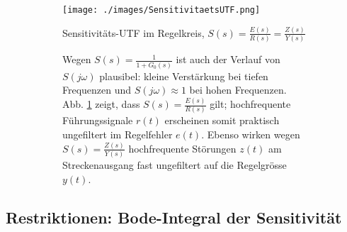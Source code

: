 \begin{figure}[h!]
	\begin{center}
	\begin{subfigure}[b]{9cm}
	\flushleft
			\texttt{[image: ./images/SensitivitaetsUTF.png]}
\caption{Sensitivitäts-UTF im Regelkreis, $S(s) = \frac{E(s)}{R(s)}=\frac{Z(s)}{Y(s)}$}
			\label{SensitivitaetRegelkreis}
	\end{subfigure}\qquad
	\begin{subfigure}[b]{8cm}
Wegen $S(s) = \frac{1}{1+G_0(s)}$ ist auch der Verlauf von $S(j\omega)$ plausibel: kleine Verstärkung
bei tiefen Frequenzen und $S(j\omega) \approx 1$ bei hohen Frequenzen. Abb. \ref{SensitivitaetRegelkreis} zeigt,
dass $S(s) = \frac{E(s)}{R(s)}$ gilt; hochfrequente Führungssignale $r(t)$ erscheinen somit praktisch
ungefiltert im Regelfehler $e(t)$. Ebenso wirken wegen $S(s) = \frac{Z(s)}{Y(s)}$ hochfrequente Störungen
$z(t)$ am Streckenausgang fast ungefiltert auf die Regelgrösse $y(t)$.

	\end{subfigure}
	\end{center}
\end{figure}



\subsection{Restriktionen: Bode-Integral der Sensitivität}

